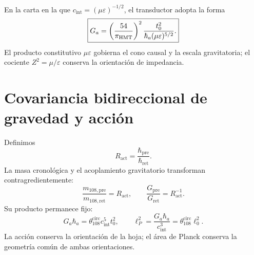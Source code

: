 En la carta en la que \(c_{\mathrm{int}}=(\mu\varepsilon)^{-1/2}\), el
transductor adopta la forma
\begin{equation}
 \boxed{
 G_a=\left(\frac{54}{\pi_{\rm HMT}}\right)^2
 \frac{t_0^2}{\hbar_a(\mu\varepsilon)^{5/2}}.}
 \label{eq:l9s102:g-mu-epsilon}
\end{equation}
El producto constitutivo \(\mu\varepsilon\) gobierna el cono causal y la
escala gravitatoria; el cociente \(Z^2=\mu/\varepsilon\) conserva la
orientación de impedancia.

\section{Covariancia bidireccional de gravedad y acción}
\label{sec:l9s102:g-hbar}

Definimos
\begin{equation}
 R_{\mathrm{act}}=\frac{\hbar_{\mathrm{pre}}}
 {\hbar_{\mathrm{ret}}}.
 \label{eq:l9s102:r-act}
\end{equation}
La masa cronológica y el acoplamiento gravitatorio transforman
contragredientemente:
\begin{equation}
 \frac{m_{108,\mathrm{pre}}}{m_{108,\mathrm{ret}}}=R_{\mathrm{act}},
 \qquad
 \frac{G_{\mathrm{pre}}}{G_{\mathrm{ret}}}=R_{\mathrm{act}}^{-1}.
 \label{eq:l9s102:g-hbar-reciprocidad}
\end{equation}
Su producto permanece fijo:
\begin{equation}
 \boxed{
 G_a\hbar_a
 =\theta_{108}^{\mathrm{circ}}c_{\mathrm{int}}^5t_0^2,
 \qquad
 \ell_P^2=\frac{G_a\hbar_a}{c_{\mathrm{int}}^3}
 =\theta_{108}^{\mathrm{circ}}\ell_0^2.}
 \label{eq:l9s102:g-hbar-invariante}
\end{equation}
La acción conserva la orientación de la hoja; el área de Planck conserva la
geometría común de ambas orientaciones.

